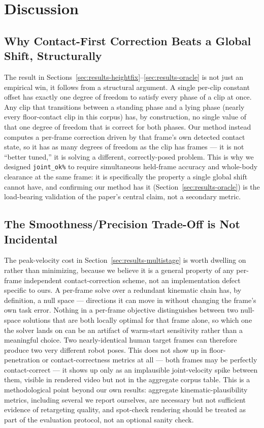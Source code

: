 \section{Discussion}
\label{sec:discussion}

\subsection{Why Contact-First Correction Beats a Global Shift, Structurally}
\label{sec:disc-structural}

The result in Sections~\ref{sec:results-heightfix}--\ref{sec:results-oracle}
is not just an empirical win, it follows from a structural argument. A
single per-clip constant offset has exactly one degree of freedom to
satisfy every phase of a clip at once. Any clip that transitions between a
standing phase and a lying phase (nearly every floor-contact clip in this
corpus) has, by construction, no single value of that one degree of freedom
that is correct for both phases. Our method instead computes a per-frame
correction driven by that frame's own detected contact state, so it has as
many degrees of freedom as the clip has frames --- it is not ``better
tuned,'' it is solving a different, correctly-posed problem. This is why we
designed \texttt{joint\_ok\%} to require simultaneous held-frame accuracy
and whole-body clearance at the same frame: it is specifically the property
a single global shift cannot have, and confirming our method has it
(Section~\ref{sec:results-oracle}) is the load-bearing validation of the
paper's central claim, not a secondary metric.

\subsection{The Smoothness/Precision Trade-Off is Not Incidental}
\label{sec:disc-tradeoff}

The peak-velocity cost in Section~\ref{sec:results-multistage} is worth
dwelling on rather than minimizing, because we believe it is a general
property of any per-frame independent contact-correction scheme, not an
implementation defect specific to ours. A per-frame solve over a redundant
kinematic chain has, by definition, a null space --- directions it can move
in without changing the frame's own task error. Nothing in a per-frame
objective distinguishes between two null-space solutions that are both
locally optimal for that frame alone, so which one the solver lands on can
be an artifact of warm-start sensitivity rather than a meaningful choice.
Two nearly-identical human target frames can therefore produce two very
different robot poses. This does not show up in floor-penetration or
contact-correctness metrics at all --- both frames may be perfectly
contact-correct --- it shows up only as an implausible joint-velocity spike
between them, visible in rendered video but not in the aggregate corpus
table. This is a methodological point beyond our own results: aggregate
kinematic-plausibility metrics, including several we report ourselves, are
necessary but not sufficient evidence of retargeting quality, and
spot-check rendering should be treated as part of the evaluation protocol,
not an optional sanity check.

